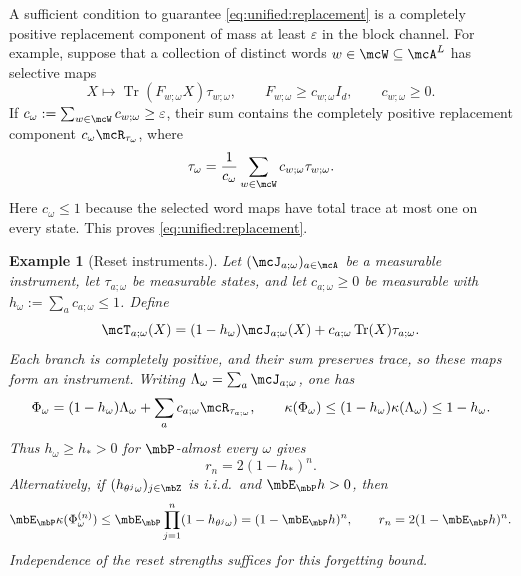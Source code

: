 \documentclass[a4paper]{article}
\numberwithin{equation}{section}   %
\theoremstyle{plain}   %
\theoremstyle{plain}   %
\theoremstyle{examplestyle}
\newtheorem{example}{Example}
\DeclareMathOperator{\pr}{\mbP}           %
\begin{document}
    
        A sufficient condition to guarantee \cref{eq:unified:replacement} is a completely positive replacement component of mass at least $\varepsilon$ in the block channel.
        For example, suppose that a collection of distinct words $w\in\mcW\subseteq\mcA^L$ has selective maps
        \[
             X\longmapsto\operatorname{Tr}(F_{w;\omega}X)\tau_{w;\omega},
             \qquad
             F_{w;\omega}\ge c_{w;\omega}I_d,
             \qquad c_{w;\omega}\ge0.
        \]
        If $c_\omega:=\sum_{w\in\mcW}c_{w;\omega}\ge\varepsilon$, their sum contains the completely positive replacement component $c_\omega\mcR_{\tau_\omega}$, where
        \[
             \tau_\omega
             =\frac{1}{c_\omega}
               \sum_{w\in\mcW}c_{w;\omega}\tau_{w;\omega}.
        \]
        Here $c_\omega\le1$ because the selected word maps have total trace at most one on every state.
        This proves \eqref{eq:unified:replacement}.
    
    \begin{example}[Reset instruments.]
    \label{eg:reset-instrument-family}
        Let $(\mcJ_{a;\omega})_{a\in\mcA}$ be a measurable instrument, let $\tau_{a;\omega}$ be measurable states, and let $c_{a;\omega}\ge0$ be measurable with $h_\omega:=\sum_ac_{a;\omega}\le1$.
        Define
        \begin{equation}
        \label{eq:unified:reset-family}
             \mcT_{a;\omega}(X)
             =(1-h_\omega)\mcJ_{a;\omega}(X)
                   +c_{a;\omega}\operatorname{Tr}(X)\tau_{a;\omega}.
        \end{equation}
        Each branch is completely positive, and their sum preserves trace, so these maps form an instrument.
        Writing $\Lambda_\omega=\sum_a\mcJ_{a;\omega}$, one has
            \[
             \Phi_\omega
             =(1-h_\omega)\Lambda_\omega
                   +\sum_ac_{a;\omega}\mcR_{\tau_{a;\omega}},
             \qquad
             \kappa(\Phi_\omega)
             \le(1-h_\omega)\kappa(\Lambda_\omega)
             \le1-h_\omega.
        \]
        Thus $h_\omega\ge h_*>0$ for $\pr$-almost every $\omega$ gives
        \[
            r_n=2(1-h_*)^n.
        \]
        Alternatively, if $(h_{\theta^j\omega})_{j\in\mbZ}$ is
        i.i.d.\ and $\mbE_{\pr}h>0$, then
        \[
             \mbE_{\pr}\kappa(\Phi_\omega^{(n)})
             \le\mbE_{\pr}\prod_{j=1}^n(1-h_{\theta^j\omega})
             =(1-\mbE_{\pr}h)^n,
             \qquad
             r_n=2(1-\mbE_{\pr}h)^n.
        \]
        Independence of the reset strengths suffices for this forgetting bound.
    \end{example}
\end{document}

